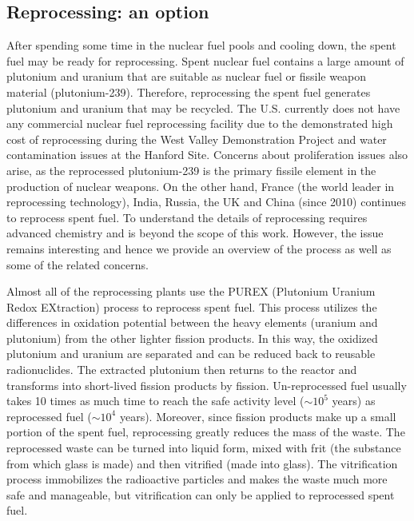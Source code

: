 \documentclass[nofootinbib,preprint,aps]{revtex4-1}
\begin{document}
    \subsection{Reprocessing: an option}
    \label{sec:reproc}
    After spending some time in the nuclear fuel pools and cooling down, the spent fuel may be ready
    for reprocessing.
    Spent nuclear fuel contains a large amount of plutonium and uranium that are suitable as nuclear fuel
    or fissile weapon material (plutonium-239). Therefore, reprocessing the spent fuel generates plutonium and
    uranium that may be recycled. The U.S. currently does not have any commercial nuclear fuel
    reprocessing facility due to the demonstrated high cost of reprocessing
    during the West Valley Demonstration Project and water contamination issues at the Hanford Site.
    Concerns about proliferation issues also arise, as the 
    reprocessed plutonium-239 is the primary fissile element in the production of nuclear weapons.\cite{aa12}
    On the other hand, France (the world leader in reprocessing technology), India, Russia, the UK
    and China (since 2010) continues to reprocess spent fuel. To understand the details of reprocessing
    requires advanced chemistry and is beyond the scope of this work. However, the issue remains interesting
    and hence we provide an overview of the process as well as some of the related concerns.

    Almost all of the reprocessing plants use the PUREX (Plutonium Uranium Redox EXtraction) process
    to reprocess spent fuel. This process utilizes the differences in oxidation potential 
    between the heavy elements (uranium and plutonium) from the other lighter fission products.
    In this way,
    the oxidized plutonium and uranium are separated and can be reduced back to reusable radionuclides.\cite{lb01} 
    The extracted plutonium then returns to the reactor and transforms into short-lived fission products
    by fission. Un-reprocessed fuel usually takes 10 times as much time to reach the safe
    activity level ($\sim 10^5$ years) as reprocessed fuel ($\sim 10^4$ years). Moreover, since fission products
    make up a small portion of the spent fuel, reprocessing greatly reduces the mass of the waste. The reprocessed
    waste can be turned into liquid form, mixed with frit (the substance from which glass is made) and then
    vitrified (made into glass). The vitrification process immobilizes the radioactive particles and makes
    the waste much more safe and manageable, but vitrification can only be applied to reprocessed spent fuel.
\end{document}
